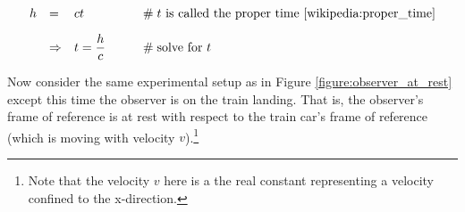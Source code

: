 \documentclass{article}
\theoremstyle{definition}
\begin{document}
\smallskip
\begin{equation*}
  \begin{array}{llll}
     h
     &=& c t 					
     		&\hspace{2em} \mathrel{\#} \text{$t$ is called 
		        the proper time \cite{wikipedia:proper_time}} \\                
[10pt]
	 &\Rightarrow& t = \dfrac{h}{c} 
	 		&\hspace{2em} \mathrel{\#} \text{solve for $t$}
  \end{array}
\end{equation*}

\medskip
\noindent
Now consider the same experimental setup as in Figure
\ref{figure:observer_at_rest} except this time the observer is on
the train landing. That is, the observer's frame of reference is
at rest with respect to the train car's frame of reference (which
is moving with velocity $v$).\footnote{Note that the velocity $v$
here is a the real constant representing a velocity confined to
the x-direction.}
\end{document}
